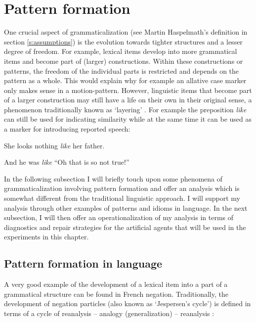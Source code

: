\section{Pattern formation}
\label{s:pattern-formation}

One crucial aspect of grammaticalization (see Martin Haspelmath's definition in section \ref{s:assumptions}) is the evolution towards tighter structures and a lesser degree of freedom. For example, lexical items develop into more grammatical items and become part of (larger) constructions. Within these constructions or patterns, the freedom of the individual parts is restricted and depends on the pattern as a whole. This would explain why for example an allative case marker only makes sense in a motion-pattern. However, linguistic items that become part of a larger construction may still have a life on their own in their original sense, a phenomenon traditionally known as `layering' \citep[124--126]{hopper93grammaticalization}. For example the preposition {\em like} can still be used for indicating similarity while at the same time it can be used as a marker for introducing reported speech:

\ea
She looks nothing {\em like} her father.
\item And he was {\em like} ``Oh that is so not true!''
\z

In the following subsection I will briefly touch upon some phenomena of grammaticalization involving pattern formation and offer an analysis which is somewhat different from the traditional linguistic approach. I will support my analysis through other examples of patterns and idioms in language. In the next subsection, I will then offer an operationalization of my analysis in terms of diagnostics and repair strategies for the artificial agents that will be used in the experiments in this chapter.



\subsection{Pattern formation in language}

A very good example of the development of a lexical item into a part of a grammatical structure can be found in French negation. Traditionally, the development of negation particles (also known as `Jespersen's cycle') is defined in terms of a cycle of reanalysis -- analogy (generalization) -- reanalysis \cite[65--66]{hopper93grammaticalization}:

